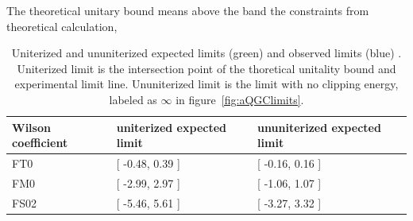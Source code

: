 The theoretical unitary bound means above the band the constraints from theoretical calculation,

\begin{table}[ht!]
\small
\begin{center}
\begin{tabular}{ | l || l | l |}
\hline
Wilson coefficient & uniterized expected limit  & ununiterized expected limit \tabularnewline \hline
FT0                &  [ -0.48, 0.39 ]            & [ -0.16, 0.16 ]              \tabularnewline \hline
FM0                &  [ -2.99, 2.97 ]            & [ -1.06, 1.07 ]              \tabularnewline \hline
FS02               &  [ -5.46, 5.61 ]            & [ -3.27, 3.32 ]              \tabularnewline \hline
\end{tabular}
\caption{Uniterized and ununiterized expected limits (green) and observed limits (blue) . Uniterized limit is the intersection point of the thoretical unitality bound and experimental limit line. Ununiterized limit is the limit with no clipping energy, labeled as $\infty$ in figure~\ref{fig:aQGClimits}.}
\label{tab:aQGClimits}
\end{center}
\end{table}




